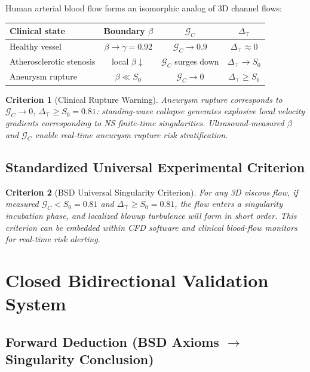 \documentclass[11pt,a4paper]{article}
\newtheorem{criterion}{Criterion}
\theoremstyle{remark}
\newcommand{\Szero}{S_{0}}
\newcommand{\GC}{\mathcal{G}_{\!C}}
\newcommand{\Dtop}{\Delta_{\!\top}}
\begin{document}
Human arterial blood flow forms an isomorphic analog of 3D channel flows:

\begin{center}
\begin{tabular}{lccc}
\toprule
Clinical state & Boundary $\beta$ & $\GC$ & $\Dtop$ \\
\midrule
Healthy vessel           & $\beta\to\gamma=0.92$ & $\GC\to 0.9$ & $\Dtop\approx 0$ \\
Atherosclerotic stenosis & local $\beta\downarrow$ & $\GC$ surges down & $\Dtop\to\Szero$ \\
Aneurysm rupture         & $\beta\ll\Szero$ & $\GC\to 0$ & $\Dtop\ge\Szero$ \\
\bottomrule
\end{tabular}
\end{center}

\begin{criterion}[Clinical Rupture Warning]\label{crit:clinical}
Aneurysm rupture corresponds to $\GC\to 0$, $\Dtop\ge\Szero=0.81$: standing-wave collapse generates explosive local velocity gradients corresponding to NS finite-time singularities. Ultrasound-measured $\beta$ and $\GC$ enable real-time aneurysm rupture risk stratification.
\end{criterion}

\subsection{Standardized Universal Experimental Criterion}\label{sec:universal}

\begin{criterion}[BSD Universal Singularity Criterion]\label{crit:universal}
For any 3D viscous flow, if measured $\GC<\Szero=0.81$ and $\Dtop\ge\Szero=0.81$, the flow enters a singularity incubation phase, and localized blowup turbulence will form in short order. This criterion can be embedded within CFD software and clinical blood-flow monitors for real-time risk alerting.
\end{criterion}

\section{Closed Bidirectional Validation System}\label{sec:validation}

\subsection{Forward Deduction (BSD Axioms $\to$ Singularity Conclusion)}
\end{document}
